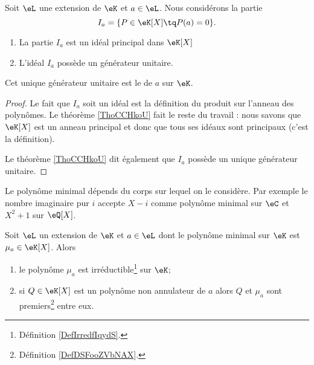\begin{lemmaDef}    \label{DefCVMooFGSAgL}
    Soit \( \eL\) une extension de \( \eK\) et \( a\in \eL\). Nous considérons la partie
    \begin{equation}
        I_a=\{ P\in \eK[X]\tq P(a)=0 \}.
    \end{equation}

    \begin{enumerate}
        \item
            La partie \( I_a\) est un idéal principal dans \( \eK[X]\)
        \item
            L'idéal \( I_a\) possède un générateur unitaire.
    \end{enumerate}

    Cet unique générateur unitaire est le  de \( a\) sur \( \eK\).
\end{lemmaDef}

\begin{proof}
    Le fait que \( I_a\) soit un idéal est la définition du produit sur l'anneau des polynômes. Le théorème \ref{ThoCCHkoU} fait le reste du travail : nous savons que \( \eK[X]\) est un anneau principal et donc que tous ses idéaux sont principaux (c'est la définition).
   
    Le théorème \ref{ThoCCHkoU} dit également que \( I_a\) possède un unique générateur unitaire.
\end{proof}

\begin{example}
    Le polynôme minimal dépends du corps sur lequel on le considère. Par exemple le nombre imaginaire pur \( i\) accepte \( X-i\) comme polynôme minimal sur \( \eC\) et \( X^2+1\) sur \( \eQ[X]\).
\end{example}

\begin{proposition}  \label{PropRARooKavaIT}
    Soit \( \eL\) un extension de \( \eK\) et \( a\in \eL\) dont le polynôme minimal sur \( \eK\) est \( \mu_a\in\eK[X]\). Alors
    \begin{enumerate}
        \item   \label{ItemDOQooYpLvXri}
            le polynôme \( \mu_a\) est irréductible\footnote{Définition \ref{DefIrredfIqydS}.} sur \( \eK\);
        \item
            si \( Q\in \eK[X]\) est un polynôme non annulateur de \( a\) alors \( Q\) et \( \mu_a\) sont premiers\footnote{Définition \ref{DefDSFooZVbNAX}.} entre eux.
    \end{enumerate}
\end{proposition}

